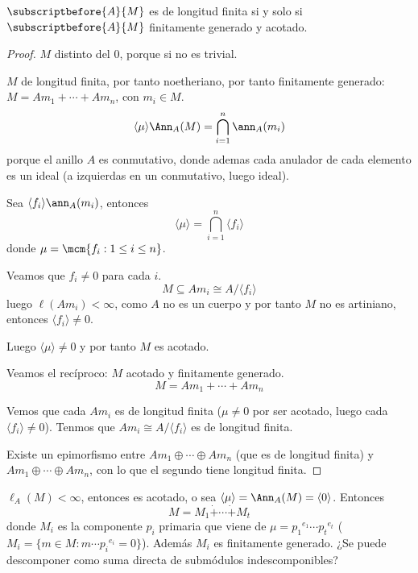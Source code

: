 \begin{lema}
  \(\subscriptbefore{A}{M}\) es de longitud finita si y solo si
  \(\subscriptbefore{A}{M}\) finitamente generado y acotado.
\end{lema}
\begin{proof}
  \(M\) distinto del 0, porque si no es trivial.

  \(M\) de longitud finita, por tanto noetheriano, por tanto finitamente
  generado: \(M=Am_1+\cdots+Am_n\), con \(m_i\in M\).
  \[
    \langle\mu\rangle\Ann_A(M)=\bigcap_{i=1}^n\ann_A(m_i)
  \]
  porque el anillo \(A\) es conmutativo, donde ademas cada anulador
  de cada elemento es un ideal (a izquierdas en un conmutativo, luego ideal).

  Sea \(\langle f_i\rangle\ann_A(m_i)\), entonces
  \[
    \langle\mu\rangle=\bigcap_{i=1}^n\langle f_i\rangle
  \]
  donde \(\mu=\mcm\{f_i:1\le i\le n\}\).

  Veamos que \(f_i\neq 0\) para cada \(i\).
  \[
    M\subseteq Am_i\cong A/\langle f_i\rangle
  \]
  luego \(\ell(Am_i)<\infty\), como \(A\) no es un cuerpo y por
  tanto \(M\) no es artiniano, entonces
  \(\langle f_i\rangle\neq0\).

  Luego \(\langle\mu\rangle\neq 0\) y por tanto \(M\) es acotado.

  Veamos el recíproco: \(M\) acotado y finitamente generado.
  \[
    M=Am_1+\cdots+Am_n
  \]

  Vemos que cada \(Am_i\) es de longitud finita (\(\mu\neq 0\) por ser
  acotado, luego cada \(\langle f_i\rangle\neq 0\)).
  Tenmos que \(Am_i\cong A/\langle f_i\rangle\) es de longitud finita.

  Existe un epimorfismo entre \(Am_1\oplus\cdots\oplus Am_n\) (que es
  de longitud finita) y \(Am_1\oplus\cdots\oplus Am_n\), con lo que
  el segundo tiene longitud finita.
\end{proof}

\(\ell_A(M)<\infty\), entonces es acotado, o sea
\(\langle\mu\rangle=\Ann_A(M)=\langle 0\rangle\). Entonces
\[
  M=M_1\dot{+}\cdots\dot{+} M_t
\]
donde \(M_i\) es la componente \(p_i\) primaria que viene de
\(\mu={p_1}^{e_1}\cdots{p_t}^{e_t}\)
(\(M_i=\{m\in M:m\cdots{p_i}^{e_i}=0\}\)).
Además \(M_i\) es finitamente generado.
¿Se puede descomponer como suma directa de submódulos indescomponibles?
